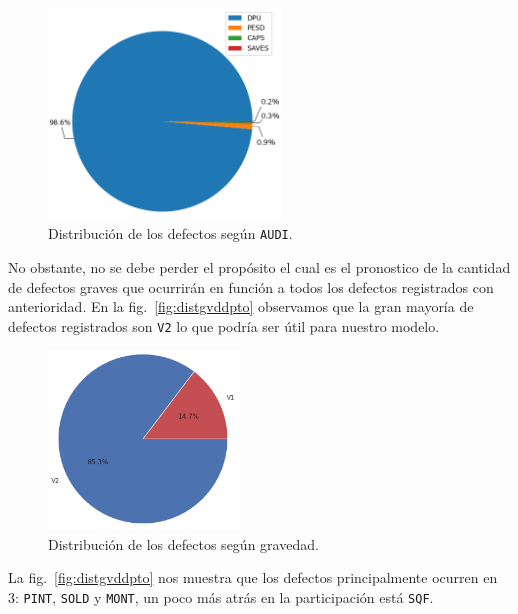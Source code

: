 \documentclass[a4paper,12pt]{article}
\begin{document}
		\begin{figure}[H]
			\begin{center}				
				\includegraphics[width=0.55\textwidth]{audidist.png}
				\caption{Distribución de los defectos según \texttt{AUDI}.}
				\label{fig:distaudi}
			\end{center}
		\end{figure}
		
		No obstante, no se debe perder el propósito el cual es el pronostico de la cantidad de defectos graves que ocurrirán en función a todos los defectos registrados con anterioridad. En la fig.~\ref{fig:distgvddpto} observamos que la gran mayoría de defectos registrados son \texttt{V2} lo que podría ser útil para nuestro modelo.
		
		\begin{figure}[H]
			\begin{center}				
				\includegraphics[width=0.45\textwidth]{tesis_51.png}
				\caption{Distribución de los defectos según gravedad.}
				\label{fig:distgvd}
			\end{center}
		\end{figure}
		
		La fig.~\ref{fig:distgvddpto} nos muestra que los defectos principalmente ocurren en 3: \texttt{PINT}, \texttt{SOLD} y \texttt{MONT}, un poco más atrás en la participación está \texttt{SQF}.
		
\end{document}
